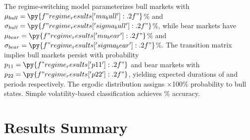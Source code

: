 \documentclass[a4paper, 11pt]{article}
\begin{document}
The regime-switching model parameterizes bull markets with $\mu_{bull} = \py{f"{regime_results['mu_bull']:.2f}"}$\%
and $\sigma_{bull} = \py{f"{regime_results['sigma_bull']:.2f}"}$\%, while bear markets have
$\mu_{bear} = \py{f"{regime_results['mu_bear']:.2f}"}$\% and
$\sigma_{bear} = \py{f"{regime_results['sigma_bear']:.2f}"}$\%. The transition matrix implies
bull markets persist with probability $p_{11} = \py{f"{regime_results['p11']:.2f}"}$ and bear
markets with $p_{22} = \py{f"{regime_results['p22']:.2f}"}$, yielding expected durations of
 and
 periods respectively. The ergodic
distribution assigns $\times$100\% probability to bull
states. Simple volatility-based classification achieves
\% accuracy.

\section{Results Summary}
\end{document}
